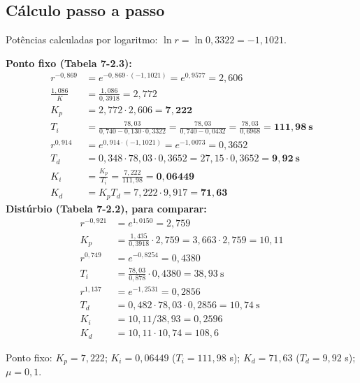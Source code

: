 \subsection{Cálculo passo a passo}
Potências calculadas por logaritmo: $\ln r=\ln0{,}3322=-1{,}1021$.

\textbf{Ponto fixo (Tabela 7-2.3):}
\begin{align*}
r^{-0{,}869}&=e^{-0{,}869\cdot(-1{,}1021)}=e^{0{,}9577}=2{,}606\\
\frac{1{,}086}{K}&=\frac{1{,}086}{0{,}3918}=2{,}772\\
K_p&=2{,}772\cdot2{,}606=\mathbf{7{,}222}\\
T_i&=\frac{78{,}03}{0{,}740-0{,}130\cdot0{,}3322}=\frac{78{,}03}{0{,}740-0{,}0432}=\frac{78{,}03}{0{,}6968}=\mathbf{111{,}98\ s}\\
r^{0{,}914}&=e^{0{,}914\cdot(-1{,}1021)}=e^{-1{,}0073}=0{,}3652\\T_d&=0{,}348\cdot78{,}03\cdot0{,}3652=27{,}15\cdot0{,}3652=\mathbf{9{,}92\ s}\\
K_i&=\frac{K_p}{T_i}=\frac{7{,}222}{111{,}98}=\mathbf{0{,}06449}\\K_d&=K_pT_d=7{,}222\cdot9{,}917=\mathbf{71{,}63}
\end{align*}
\textbf{Distúrbio (Tabela 7-2.2), para comparar:}
\begin{align*}
r^{-0{,}921}&=e^{1{,}0150}=2{,}759\\K_p&=\frac{1{,}435}{0{,}3918}\cdot2{,}759=3{,}663\cdot2{,}759=10{,}11\\
r^{0{,}749}&=e^{-0{,}8254}=0{,}4380\\T_i&=\frac{78{,}03}{0{,}878}\cdot0{,}4380=38{,}93\ \mathrm{s}\\
r^{1{,}137}&=e^{-1{,}2531}=0{,}2856\\T_d&=0{,}482\cdot78{,}03\cdot0{,}2856=10{,}74\ \mathrm{s}\\
K_i&=10{,}11/38{,}93=0{,}2596\\K_d&=10{,}11\cdot10{,}74=108{,}6
\end{align*}
\begin{res}Ponto fixo: $K_p=7{,}222$; $K_i=0{,}06449$ ($T_i=111{,}98$ s); $K_d=71{,}63$ ($T_d=9{,}92$ s); $\mu=0{,}1$.\end{res}


